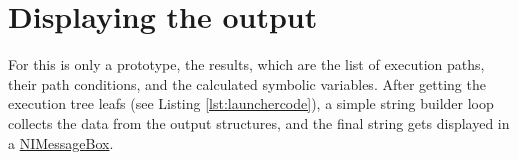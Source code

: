 \section{Displaying the output}
For this is only a prototype, the results, which are the list of execution paths, their path conditions, and the calculated symbolic variables. After getting the execution tree leafs (see Listing \ref{lst:launchercode}), a simple string builder loop collects the data from the output structures, and the final string gets displayed in a \underline{NIMessageBox}.
